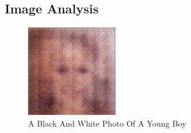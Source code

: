 \documentclass{article}%
\begin{document}
%
\subsection{Image Analysis}%
\label{subsec:ImageAnalysis}%


\begin{figure}[h!]%
\centering%
\includegraphics[width=150px]{500_fake_images/samples_5_56.png}%
\caption{A Black And White Photo Of A Young Boy}%
\end{figure}

%
\end{document}
